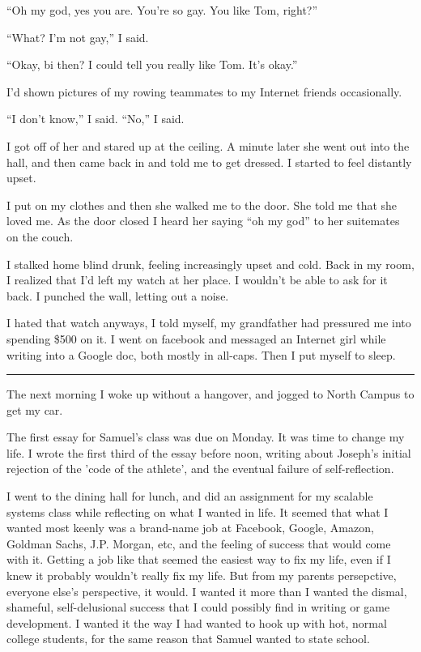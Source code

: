 ``Oh my god, yes you are.  You're so gay.  You like Tom, right?''

``What?  I'm not gay,'' I said.

``Okay, bi then?  I could tell you really like Tom.  It's okay.''

I'd shown pictures of my rowing teammates to my Internet friends occasionally.

``I don't know,'' I said.  ``No,'' I said.

I got off of her and stared up at the ceiling.  A minute later she went out into
the hall, and then came back in and told me to get dressed.  I started to feel
distantly upset.

I put on my clothes and then she walked me to the door.  She told me that she
loved me.  As the door closed I heard her saying ``oh my god'' to her suitemates
on the couch.

I stalked home blind drunk, feeling increasingly upset and cold.  Back in my
room, I realized that I'd left my watch at her place.  I wouldn't be able to ask
for it back.  I punched the wall, letting out a noise.  

I hated that watch anyways, I told myself, my grandfather had pressured me into
spending \$500 on it.  I went on facebook and messaged an Internet girl while
writing into a Google doc, both mostly in all-caps.  Then I put myself to sleep.

\plainfancybreak{12pt}{2}{* * *}

The next morning I woke up without a hangover, and jogged to North Campus to get
my car.  

The first essay for Samuel's class was due on Monday.  It was time to change my
life.  I wrote the first third of the essay before noon, writing about Joseph's
initial rejection of the 'code of the athlete', and the eventual failure of
self-reflection.

I went to the dining hall for lunch, and did an assignment for my scalable
systems class while reflecting on what I wanted in life.  It seemed that what I
wanted most keenly was a brand-name job at Facebook, Google, Amazon, Goldman
Sachs, J.P.  Morgan, etc, and the feeling of success that would come with it.
Getting a job like that seemed the easiest way to fix my life, even if I knew it
probably wouldn't really fix my life.  But from my parents persepctive, everyone
else's perspective, it would.  I wanted it more than I wanted the dismal,
shameful, self-delusional success that I could possibly find in writing or game
development.  I wanted it the way I had wanted to hook up with hot, normal
college students, for the same reason that Samuel wanted to state school. 

